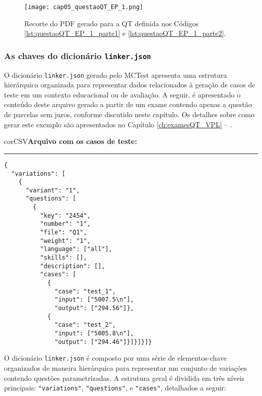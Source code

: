 \begin{figure}[!ht]
  \texttt{[image: cap05\_questaoQT\_EP\_1.png]}
  \caption{Recorte do PDF gerado para a QT definida nos Códigos \ref{lst:questaoQT_EP_1_parte1} e \ref{lst:questaoQT_EP_1_parte2}.}
  \label{fig:cap05_questaoQT_EP_1}
\end{figure}

\subsubsection{As chaves do dicionário \texttt{linker.json}} 

O dicionário \verb|linker.json| gerado pelo MCTest apresenta uma estrutura hierárquica organizada para representar dados relacionados à geração de casos de teste em um contexto educacional ou de avaliação. A seguir, é apresentado o conteúdo deste arquivo gerado a partir de um exame contendo apenas a questão de parcelas sem juros, conforme discutido neste capítulo. Os detalhes sobre como gerar este exemplo são apresentados no Capítulo \ref{ch:examesQT_VPL} -- . 

\begin{myboxCode}{corCSV}{\textbf{Arquivo com os casos de teste:}}\vspace{3mm}
    \hrule
    \begin{verbatim}
{
  "variations": [
    {
      "variant": "1",
      "questions": [
        {
          "key": "2454",
          "number": "1",
          "file": "Q1",
          "weight": "1",
          "language": ["all"],
          "skills": [],
          "description": [],
          "cases": [
            {
              "case": "test_1",
              "input": ["5007.5\n"],
              "output": ["294.56"]},
            {
              "case": "test_2",
              "input": ["5005.8\n"],
              "output": ["294.46"]}]}]}]}
\end{verbatim}
\end{myboxCode}


O dicionário \verb|linker.json| é composto por uma série de elementos-chave organizados de maneira hierárquica para representar um conjunto de variações contendo questões parametrizadas. A estrutura geral é dividida em três níveis principais: \verb|"variations"|, \verb|"questions"|, e \verb|"cases"|, detalhados a seguir:

